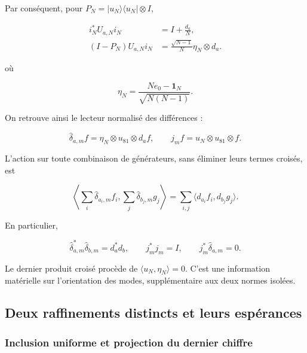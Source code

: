 Par conséquent, pour \(P_N=|u_N\rangle\langle u_N|\otimes I\),

\begin{equation}
\begin{aligned}
i_N^*U_{a,N}i_N&=I+\frac{d_a}{N},\\
(I-P_N)U_{a,N}i_N
&=\frac{\sqrt{N-1}}{N}\eta_N\otimes d_a.
\end{aligned}
\label{viii:gamma-add-display-3}
\end{equation}

où

\begin{equation}
\eta_N=\frac{Ne_0-\mathbf1_N}{\sqrt{N(N-1)}}.
\label{viii:gamma-add-display-4}
\end{equation}

On retrouve ainsi le lecteur normalisé des différences :

\begin{equation}
\widehat\delta_{a,m}f=\eta_N\otimes u_{81}\otimes d_af,
\qquad
j_mf=u_N\otimes u_{81}\otimes f.
\label{viii:gamma-add-display-5}
\end{equation}

L'action sur toute combinaison de générateurs, sans éliminer leurs termes croisés, est

\begin{equation}
\left\langle\sum_i\widehat\delta_{a_i,m}f_i,
                  \sum_j\widehat\delta_{b_j,m}g_j\right\rangle
=\sum_{i,j}\langle d_{a_i}f_i,d_{b_j}g_j\rangle.
\label{viii:gamma-add-display-6}
\end{equation}

En particulier,

\begin{equation}
\widehat\delta_{a,m}^*\widehat\delta_{b,m}=d_a^*d_b,\qquad
j_m^*j_m=I,\qquad
j_m^*\widehat\delta_{a,m}=0.
\label{viii:gamma-add-eq-1}
\end{equation}

Le dernier produit croisé procède de \(\langle u_N,\eta_N\rangle=0\). C'est une information matérielle sur l'orientation des modes, supplémentaire aux deux normes isolées.

\subsection{Deux raffinements distincts et leurs espérances}
\label{viii:gamma-add-sub-108}

\subsubsection{Inclusion uniforme et projection du dernier chiffre}
\label{viii:gamma-add-sub-110}

